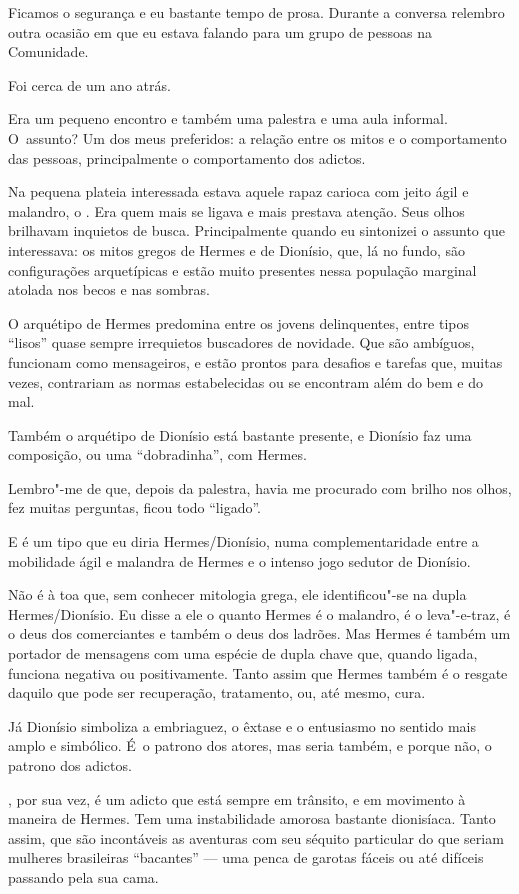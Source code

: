 Ficamos o segurança e eu bastante tempo de prosa. Durante a conversa
relembro outra ocasião em que eu estava falando para um grupo de pessoas
na Comunidade.

Foi cerca de um ano atrás.

Era um pequeno encontro e também uma palestra e uma aula informal. O~assunto? Um dos meus preferidos: a relação entre os mitos e o
comportamento das pessoas, principalmente o comportamento dos adictos.

Na pequena plateia interessada estava aquele rapaz carioca com jeito
ágil e malandro, o . Era quem mais se ligava e mais prestava atenção.
Seus olhos brilhavam inquietos de busca. Principalmente quando eu
sintonizei o assunto que interessava: os mitos gregos de Hermes e de
Dionísio, que, lá no fundo, são configurações arquetípicas e estão muito
presentes nessa população marginal atolada nos becos e nas sombras.

O arquétipo de Hermes predomina entre os jovens delinquentes, entre
tipos ``lisos'' quase sempre irrequietos buscadores de novidade. Que são
ambíguos, funcionam como mensageiros, e estão prontos para desafios e
tarefas que, muitas vezes, contrariam as normas estabelecidas ou se
encontram além do bem e do mal.

Também o arquétipo de Dionísio está bastante presente, e Dionísio faz
uma composição, ou uma ``dobradinha'', com Hermes.

Lembro"-me de que, depois da palestra,  havia me procurado com brilho
nos olhos, fez muitas perguntas, ficou todo ``ligado''.

E  é um tipo que eu diria Hermes/Dionísio, numa complementaridade
entre a mobilidade ágil e malandra de Hermes e o intenso jogo sedutor de
Dionísio.

Não é à toa que, sem conhecer mitologia grega, ele identificou"-se na
dupla Hermes/Dionísio. Eu disse a ele o quanto Hermes é o malandro, é o
leva"-e-traz, é o deus dos comerciantes e também o deus dos ladrões. Mas
Hermes é também um portador de mensagens com uma espécie de dupla chave
que, quando ligada, funciona negativa ou positivamente. Tanto assim que
Hermes também é o resgate daquilo que pode ser recuperação, tratamento,
ou, até mesmo, cura.

Já Dionísio simboliza a embriaguez, o êxtase e o entusiasmo no
sentido mais amplo e simbólico. É~o patrono dos atores, mas seria
também, e porque não, o patrono dos adictos.

, por sua vez, é um adicto que está sempre em trânsito, e em movimento
à maneira de Hermes. Tem uma instabilidade amorosa bastante dionisíaca.
Tanto assim, que são incontáveis as aventuras com seu séquito particular
do que seriam mulheres brasileiras ``bacantes'' --- uma penca de garotas
fáceis ou até difíceis passando pela sua cama.


